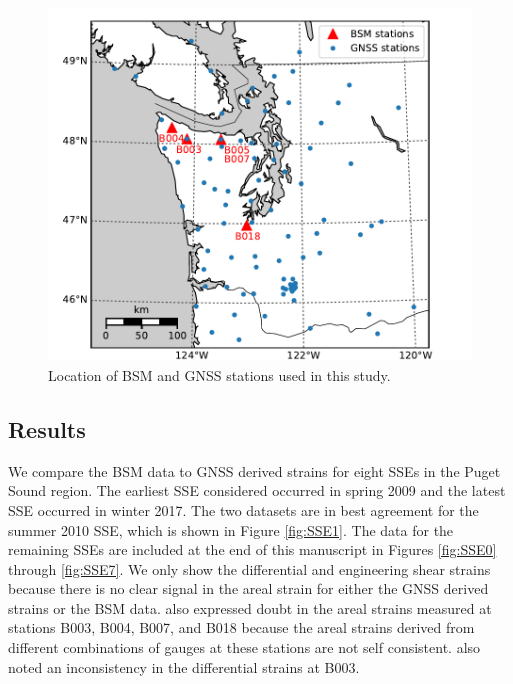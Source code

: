 \begin{figure}
\includegraphics{ch5/appendix_figures/map.pdf}
\caption{Location of BSM and GNSS stations used in this study.}   
\label{fig:Map}
\end{figure}

\subsection{Results}
We compare the BSM data to GNSS derived strains for eight SSEs in the
Puget Sound region. The earliest SSE considered occurred in spring
2009 and the latest SSE occurred in winter 2017. The two datasets are
in best agreement for the summer 2010 SSE, which is shown in Figure
\ref{fig:SSE1}. The data for the remaining SSEs are included at the
end of this manuscript in Figures \ref{fig:SSE0} through
\ref{fig:SSE7}. We only show the differential and engineering shear
strains because there is no clear signal in the areal strain for
either the GNSS derived strains or the BSM data. \citet{Roeloffs2010}
also expressed doubt in the areal strains measured at stations B003,
B004, B007, and B018 because the areal strains derived from different
combinations of gauges at these stations are not self consistent.
\citet{Roeloffs2010} also noted an inconsistency in the differential
strains at B003.

